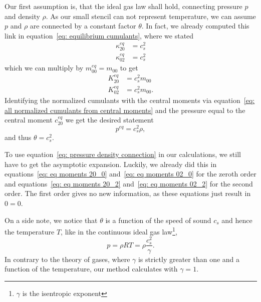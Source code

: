 Our first assumption is, that the ideal gas law shall hold, connecting pressure $p$ and density $\rho$.
As our small stencil can not represent temperature, we can assume $p$ and $\rho$ are connected by a constant factor $\theta$.
In fact, we already computed this link in equation~\eqref{eq: equilibrium cumulants}, where we stated
\begin{equation}
  \begin{aligned}
    \kappa_{20}^{eq} & = c_s^2  \\
    \kappa_{02}^{eq} & = c_s^2
  \end{aligned}
\end{equation}
which we can multiply by $m_{00}^{eq} = m_{00}$ to get
\begin{equation}
\label{eq: pressure density connection}
  \begin{aligned}
    K_{20}^{eq} & = c_s^2 m_{00}  \\
    K_{02}^{eq} & = c_s^2 m_{00}.
  \end{aligned}
\end{equation}
Identifying the normalized cumulants with the central moments via equation~\eqref{eq: all normalized cumulants from central moments} and the pressure equal to the central moment $c_{20}^{eq}$ we get the desired statement
\begin{equation}
\label{eq: pressure density connection quantities}
  p^{eq}  = c_s^2 \rho,
\end{equation}
and thus $\theta=c_s^2$.

To use equation~\eqref{eq: pressure density connection} in our calculations, we still have to get the asymptotic expansion.
Luckily, we already did this in equations~\eqref{eq: eq moments 20_0} and~\eqref{eq: eq moments 02_0} for the zeroth order and equations~\eqref{eq: eq moments 20_2} and~\eqref{eq: eq moments 02_2} for the second order.
The first order gives no new information, as these equations just result in $0=0$.

On a side note, we notice that $\theta$ is a function of the speed of sound $c_s$ and hence the temperature $T$, like in the continuous ideal gas law\footnote{$\gamma$ is the isentropic exponent },
\begin{equation}
  p=\rho RT = \rho \frac{c_s^2}{\gamma}.
\end{equation}
In contrary to the theory of gases, where $\gamma$ is strictly greater than one and a function of the temperature, our method calculates with $\gamma=1$.
